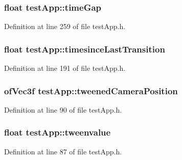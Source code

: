 \hypertarget{classtest_app_a944f2713019239a4b49241a5cc9a00c9}{
\subsubsection[{time\-Gap}]{\setlength{\rightskip}{0pt plus 5cm}float test\-App\-::time\-Gap}}\label{classtest_app_a944f2713019239a4b49241a5cc9a00c9}


Definition at line 259 of file test\-App.\-h.

\hypertarget{classtest_app_acb60fb8a89e9ec5d461630a20b11ceda}{
\subsubsection[{timesince\-Last\-Transition}]{\setlength{\rightskip}{0pt plus 5cm}float test\-App\-::timesince\-Last\-Transition}}\label{classtest_app_acb60fb8a89e9ec5d461630a20b11ceda}


Definition at line 191 of file test\-App.\-h.

\hypertarget{classtest_app_ae9f60797c1c5d9f1ac06e1d6a5259957}{
\subsubsection[{tweened\-Camera\-Position}]{\setlength{\rightskip}{0pt plus 5cm}of\-Vec3f test\-App\-::tweened\-Camera\-Position}}\label{classtest_app_ae9f60797c1c5d9f1ac06e1d6a5259957}


Definition at line 90 of file test\-App.\-h.

\hypertarget{classtest_app_add9ab1aa902948afbdf1c6db0dfde385}{
\subsubsection[{tweenvalue}]{\setlength{\rightskip}{0pt plus 5cm}float test\-App\-::tweenvalue}}\label{classtest_app_add9ab1aa902948afbdf1c6db0dfde385}


Definition at line 87 of file test\-App.\-h.

